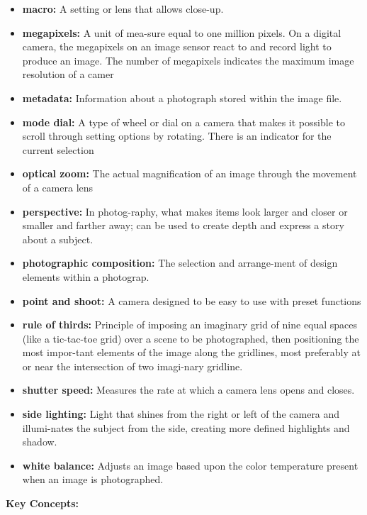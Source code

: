 \documentclass{report}
\begin{document}
\begin{itemize}
        \item \textbf{macro:} A setting or lens that allows close-up.
        \item \textbf{megapixels:} A unit of mea-sure equal to one million pixels. On a digital camera, the megapixels on an image sensor react to and record light to produce an image. The number of megapixels indicates the maximum image resolution of a camer
        \item \textbf{metadata:} Information about a photograph stored within the image file.
        \item \textbf{mode dial:} A type of wheel or dial on  a camera that makes it possible to scroll through setting options by rotating. There is an indicator for the current selection
        \item \textbf{optical zoom:} The actual magnification of an image through the movement of a camera lens
        \item \textbf{perspective:} In photog-raphy, what makes items look larger and closer or smaller and farther away; can be used to create depth and express a story about a subject.
        \item \textbf{photographic composition:} The selection and arrange-ment of design elements within a photograp.
        \item \textbf{point and shoot:} A camera designed to be easy to use with preset functions
        \item \textbf{rule of thirds:} Principle of imposing an imaginary grid of nine equal spaces (like a tic-tac-toe grid) over a scene to be photographed, then positioning the most impor-tant elements of the image along the gridlines, most preferably at or near the intersection of two imagi-nary gridline.
        \item \textbf{shutter speed:} Measures the rate at which a camera lens opens and closes.
        \item \textbf{side lighting:} Light that shines from the right or left of the camera and illumi-nates the subject from the side, creating more defined highlights and shadow.
        \item \textbf{white balance:} Adjusts an image based upon the color temperature present when an image is photographed.
    \end{itemize}

    \bigbreak \noindent \bigbreak \noindent 
    \begin{Large}
        \textbf{Key Concepts:}
    \end{Large}
\end{document}
